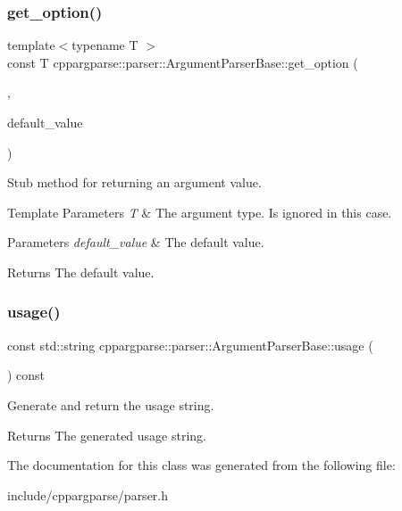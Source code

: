 \subsubsection{\texorpdfstring{get\+\_\+option()}{get\_option()}\hspace{0.1cm}{\footnotesize\ttfamily [2/2]}}
{\footnotesize\ttfamily template$<$typename T $>$ \\
const T cppargparse\+::parser\+::\+Argument\+Parser\+Base\+::get\+\_\+option (\begin{DoxyParamCaption}\item[{const \hyperlink{structcppargparse_1_1types_1_1CommandLineArgument__t}{types\+::\+Command\+Line\+Argument\+\_\+t} \&}]{,  }\item[{const T \&}]{default\+\_\+value }\end{DoxyParamCaption})\hspace{0.3cm}{\ttfamily [inline]}}



Stub method for returning an argument value. 


\begin{DoxyTemplParams}{Template Parameters}
{\em T} & The argument type. Is ignored in this case.\\
\hline
\end{DoxyTemplParams}

\begin{DoxyParams}{Parameters}
{\em default\+\_\+value} & The default value.\\
\hline
\end{DoxyParams}
\begin{DoxyReturn}{Returns}
The default value. 
\end{DoxyReturn}
\mbox{\label{classcppargparse_1_1parser_1_1ArgumentParserBase_af99c2847a2cd19b1444dcb9ab2fb8103}} 
\subsubsection{\texorpdfstring{usage()}{usage()}}
{\footnotesize\ttfamily const std\+::string cppargparse\+::parser\+::\+Argument\+Parser\+Base\+::usage (\begin{DoxyParamCaption}{ }\end{DoxyParamCaption}) const\hspace{0.3cm}{\ttfamily [inline]}}



Generate and return the usage string. 

\begin{DoxyReturn}{Returns}
The generated usage string. 
\end{DoxyReturn}


The documentation for this class was generated from the following file\+:\begin{DoxyCompactItemize}
\item 
include/cppargparse/parser.\+h\end{DoxyCompactItemize}
